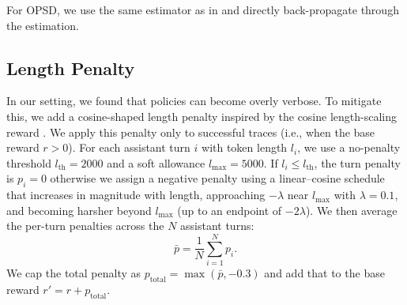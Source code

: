 For OPSD, we use the same estimator as in \citep{amini2025betterestimationkullbackleiblerdivergence} and directly back-propagate through the estimation. 

\subsection{Length Penalty}
\label{app:length-penalty}
In our setting, we found that policies can become overly verbose. To mitigate this, we add a cosine-shaped length penalty inspired by the cosine length-scaling reward \cite{yeo2025demystifyinglongchainofthoughtreasoning}. We apply this penalty only to successful traces (i.e., when the base reward $r>0$). For each assistant turn $i$ with token length $l_i$, we use a no-penalty threshold $l_{\text{th}}=2000$ and a soft allowance $l_{\max}=5000$. If $l_i \le l_{\text{th}}$, the turn penalty is $p_i=0$ otherwise we assign a negative penalty using a linear--cosine schedule that increases in magnitude with length, approaching $-\lambda$ near $l_{\max}$ with $\lambda=0.1$, and becoming harsher beyond $l_{\max}$ (up to an endpoint of $-2\lambda$). We then average the per-turn penalties across the $N$ assistant turns:
\[
\bar{p} = \frac{1}{N}\sum_{i=1}^{N} p_i .
\]
We cap the total penalty as $p_{\text{total}}=\max(\bar{p},-0.3)$ and add that to the base reward $r'=r+p_{\text{total}}$.







